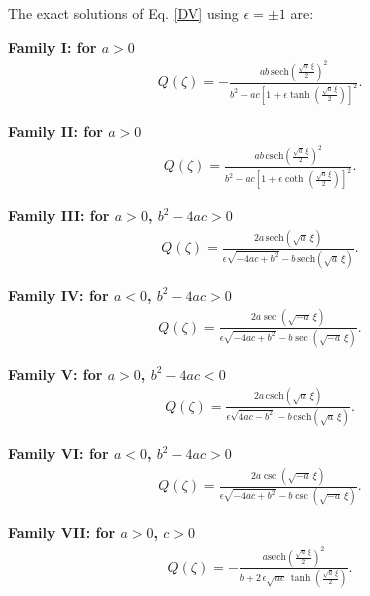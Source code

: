 \documentclass[10pt]{NSP1}
\numberwithin{equation}{section}
\begin{document}
The exact solutions of Eq. \ref{DV} using ${\epsilon=\pm1}$ are:

\textbf{Family I: for $a > 0$ }
\begin{eqnarray}\label{F1}
Q \! \left(\zeta \right) = -\frac{a b\,\mathrm{sech}\! \left(\frac{\sqrt{a}\, \xi}{2}\right)^{2}}{b^{2}-a c \left[1+\epsilon  \tanh \! \left(\frac{\sqrt{a}\, \xi}{2}\right)\right]^{2}}.
\end{eqnarray}

\textbf{Family II: for $a > 0$ }
\begin{eqnarray}\label{F2}
Q \! \left(\zeta \right) = \frac{a b\,\mathrm{csch}\! \left(\frac{\sqrt{a}\, \xi}{2}\right)^{2}}{b^{2}-a c \left[1+\epsilon  \coth \! \left(\frac{\sqrt{a}\, \xi}{2}\right)\right]^{2}}.
\end{eqnarray}

\textbf{Family III: for $a > 0$, $b^{2}-4ac > 0$ }
\begin{eqnarray}\label{F3}
Q \! \left(\zeta \right) =\frac{2 a \,\mathrm{sech}\! \left(\sqrt{a}\, \xi \right)}{\epsilon  \sqrt{-4 a c +b^{2}}-b \,\mathrm{sech}\! \left(\sqrt{a}\, \xi \right)}.
\end{eqnarray}

\textbf{Family IV: for $a < 0$, $b^{2}-4ac > 0$ }
\begin{eqnarray}\label{F4}
Q \! \left(\zeta \right) =\frac{2 a \sec \! \left(\sqrt{-a}\, \xi \right)}{\epsilon  \sqrt{-4 a c +b^{2}}-b \sec \! \left(\sqrt{-a}\, \xi \right)}.
\end{eqnarray}

\textbf{Family V: for $a > 0$, $b^{2}-4ac < 0$ }
\begin{eqnarray}\label{F5}
Q \! \left(\zeta \right) =\frac{2 a \,\mathrm{csch}\! \left(\sqrt{a}\, \xi \right)}{\epsilon  \sqrt{4 a c -b^{2}}-b \,\mathrm{csch}\! \left(\sqrt{a}\, \xi \right)}.
\end{eqnarray}

\textbf{Family VI: for $a < 0$, $b^{2}-4ac > 0$ }
\begin{eqnarray}\label{F6}
Q \! \left(\zeta \right) =\frac{2 a \csc \! \left(\sqrt{-a}\, \xi \right)}{\epsilon  \sqrt{-4 a c +b^{2}}-b \csc \! \left(\sqrt{-a}\, \xi \right)}.
\end{eqnarray}

\textbf{Family VII: for $a > 0$, $c > 0$ }
\begin{eqnarray}\label{F7}
Q \! \left(\zeta \right) =-\frac{a \mathrm{sech}\! \left(\frac{\sqrt{a}\, \xi}{2}\right)^{2}}{b +2\,\epsilon  \sqrt{a c}\, \tanh \! \left(\frac{\sqrt{a}\, \xi}{2}\right)}.
\end{eqnarray}
\end{document}
